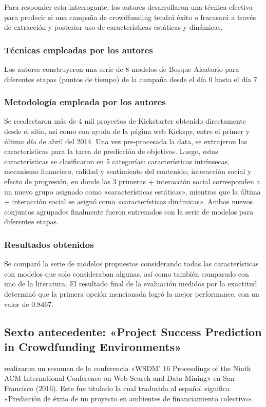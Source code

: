 Para responder esta interrogante, los autores desarrollaron una técnica efectiva para predecir si una campaña de crowdfunding tendrá éxito o fracasará a través de extracción y posterior uso de características estáticas y dinámicas.

\subsubsection{Técnicas empleadas por los autores}
Los autores construyeron una serie de 8 modelos de Bosque Aleatorio para diferentes etapas (puntos de tiempo) de la campaña desde el día 0 hasta el día 7.

\subsubsection{Metodología empleada por los autores}
Se recolectaron más de 4 mil proyectos de Kickstarter obtenido directamente desde el sitio, así como con ayuda de la página web Kickspy, entre el primer y último día de abril del 2014. Una vez pre-procesada la data, se extrajeron las características para la tarea de predicción de objetivos. Luego, estas características se clasificaron en 5 categorías: características intrínsecas, mecanismo financiero, calidad y sentimiento del contenido, interacción social y efecto de progresión, en donde las 3 primeras + interacción social corresponden a un nuevo grupo asignado como «características estáticas», mientras que la última + interacción social se asignó como «características dinámicas». Ambos nuevos conjuntos agrupados finalmente fueron entrenados con la serie de modelos para diferentes etapas.

\subsubsection{Resultados obtenidos}
Se comparó la serie de modelos propuestos considerando todas las características con modelos que solo consideraban algunas, así como también comparado con uno de la literatura. El resultado final de la evaluación medidos por la exactitud determinó que la primera opción mencionada logró la mejor performance, con un valor de 0.8467.


\subsection{Sexto antecedente: «Project Success Prediction in Crowdfunding Environments» \citep*{pr_li2016predcrowd}}
\citeauthor{pr_li2016predcrowd} realizaron un resumen de la conferencia «WSDM’ 16 Proceedings of the Ninth ACM International Conference on Web Search and Data Mining» en San Francisco (2016). Este fue titulado  la cual traducida al español significa «Predicción de éxito de un proyecto en ambientes de financiamiento colectivo».

